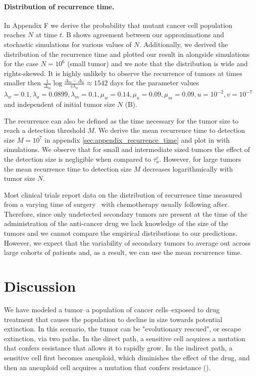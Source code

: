 \documentclass[12pt]{extarticle}
\begin{document}
\paragraph{Distribution of  recurrence time.}
In Appendix F we derive the probability that mutant cancer cell population reaches $N$ at time $t$. B shows agreement between our approximations and stochastic simulations for various values of $N$. Additionally, we derived the distribution of the recurrence time and plotted our result in  alongside simulations for the case $N=10^6$ (small tumor) and we note that the distribution is wide and rights-skewed. It is highly unlikely to observe the recurrence of tumors at times smaller then $\frac{1}{\Delta_m}\log\frac{\Delta_m-\Delta_w}{v\lambda_w}\approx1542$ days for the parameter values $\lambda_w=0.1, \lambda_a=0.0899,\lambda_m=0.1,\mu_w=0.14,\mu_a=0.09,\mu_m=0.09, u=10^{-2}, v=10^{-7}$ and independent of initial tumor size $N$ (B). 

The recurrence can also be defined as the time necessary for the tumor size to reach a detection threshold $M$. We derive the mean recurrence time to detection size $M=10^7$ in appendix \ref{sec:appendix_recurrence_time} and plot in  with simulations. We observe that  for small and intermediate sized tumors the effect of the detection size is negligible when compared to $\tau_a^r$. However, for large tumors the mean recurrence time to detection size $M$ decreases logarithmically with tumor size $N$.

Most clinical trials report data on the distribution of recurrence time measured from a varying time of surgery~\citep{avanzini2019cancer} with chemotherapy usually following after. Therefore, since only undetected secondary tumors are present at the time of the administration of the anti-cancer drug we lack knowledge of the size of the tumors and we cannot compare the empirical distributions to our predictions. However, we expect that the variability of secondary tumors to average out across large cohorts of patients and, as a result, we can use the mean recurrence time. 
\section*{Discussion}

We have modeled a tumor--a population of cancer cells--exposed to drug treatment that causes the population to decline in size towards potential extinction.
In this scenario, the tumor can be "evolutionary rescued", or escape extinction, via two paths. In the direct path, a sensitive cell acquires a mutation that confers resistance that allows it to rapidly grow. In the indirect path, a sensitive cell first becomes aneuploid, which diminishes the effect of the drug, and then an aneuploid cell acquires a mutation that confers resistance ().
\end{document}
